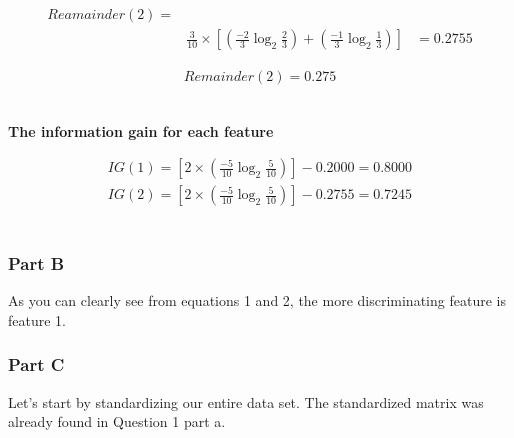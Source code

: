 \documentclass[12pt]{article}
\begin{document}
\begin{center}

\begin{align*}
Reamainder(2) =\\
&\frac{3}{10} \times [(\frac{-2}{3}\log_{2}{\frac{2}{3}}) + (\frac{-1}{3}\log_{2}{\frac{1}{3}})]
&= 0.2755
\end{align*}

\begin{align*}
Remainder(2) = 0.275
\end{align*}
\\[0.1 in]
\end{center}
\textbf{The information gain for each feature}
\begin{center}

\begin{align}
IG(1) = [2 \times (\frac{-5}{10}\log_{2}{\frac{5}{10}})] - 0.2000 = 0.8000 \\
IG(2) = [2 \times (\frac{-5}{10}\log_{2}{\frac{5}{10}})] - 0.2755 = 0.7245
\end{align}
\\[0.1 in]
\end{center}

\noindent
\subsubsection{Part B}

As you can clearly see from equations 1 and 2, the more discriminating feature is feature 1.

\noindent
\subsubsection{Part C}
Let's start by standardizing our entire data set. The standardized matrix was already found in Question 1 part a.
\end{document}
